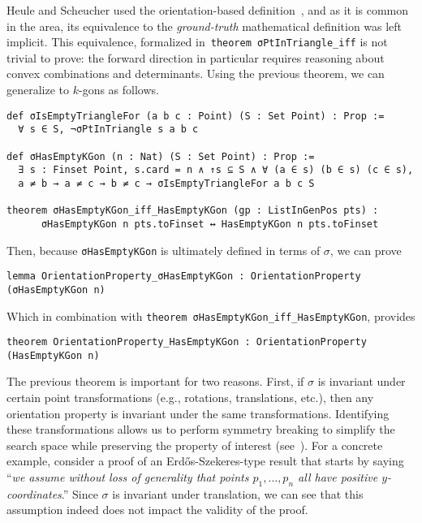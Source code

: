 



Heule and Scheucher used the orientation-based definition~\cite{emptyHexagonNumber}, and as it is common in the area, its equivalence to the \emph{ground-truth} mathematical definition was left implicit.
This equivalence, formalized in~\lstinline|theorem σPtInTriangle_iff| is not trivial to prove:
the forward direction in particular requires reasoning about convex combinations and determinants.
Using the previous theorem, we can generalize to $k$-gons as follows.
\begin{lstlisting}
def σIsEmptyTriangleFor (a b c : Point) (S : Set Point) : Prop :=
  ∀ s ∈ S, ¬σPtInTriangle s a b c

def σHasEmptyKGon (n : Nat) (S : Set Point) : Prop :=
  ∃ s : Finset Point, s.card = n ∧ ↑s ⊆ S ∧ ∀ (a ∈ s) (b ∈ s) (c ∈ s), 
  a ≠ b → a ≠ c → b ≠ c → σIsEmptyTriangleFor a b c S

theorem σHasEmptyKGon_iff_HasEmptyKGon (gp : ListInGenPos pts) :
      σHasEmptyKGon n pts.toFinset ↔ HasEmptyKGon n pts.toFinset
\end{lstlisting}

Then, because \lstinline|σHasEmptyKGon| is ultimately defined in terms of $\sigma$, we can prove
\begin{lstlisting}
lemma OrientationProperty_σHasEmptyKGon : OrientationProperty (σHasEmptyKGon n)
\end{lstlisting}
Which in combination with \lstinline|theorem σHasEmptyKGon_iff_HasEmptyKGon|, provides
\begin{lstlisting}
theorem OrientationProperty_HasEmptyKGon : OrientationProperty (HasEmptyKGon n)
\end{lstlisting}

The previous theorem is important for two reasons.
First, if $\sigma$ is invariant under certain point transformations (e.g., rotations, translations, etc.), then any orientation property is invariant under the same transformations.
Identifying these transformations allows us to perform symmetry breaking to simplify the search space while preserving the property of interest (see~).
For a concrete example, consider a proof of an Erd\H{o}s-Szekeres-type result that starts by saying ``\emph{we assume without loss of generality that points $p_1, \ldots, p_n$ all have positive $y$-coordinates}.''
Since $\sigma$ is invariant under translation, we can see that this assumption indeed does not impact the validity of the proof.

